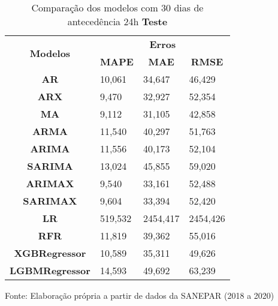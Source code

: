 \begin{table}[H]
	\centering
	\caption{Comparação dos modelos com 30 dias de antecedência 24h \textbf{Teste} }\label{tb:60-24tst}
	\begin{tabular}{@{}clll@{}}
		\toprule
		\multirow{2}{*}{\textbf{Modelos}} & \multicolumn{3}{c}{\textbf{Erros}}                                                                       \\ \cmidrule(l){2-4} 
		& \multicolumn{1}{c}{\textbf{MAPE}} & \multicolumn{1}{c}{\textbf{MAE}} & \multicolumn{1}{c}{\textbf{RMSE}} \\ \hline
\textbf{AR}                       & 10,061                            & 34,647                           & 46,429                            \\
\textbf{ARX}                      & 9,470                             & 32,927                           & 52,354                            \\
\textbf{MA}                       & 9,112                             & 31,105                           & 42,858                            \\
\textbf{ARMA}                     & 11,540                            & 40,297                           & 51,763                            \\
\textbf{ARIMA}                    & 11,556                            & 40,173                           & 52,104                            \\
\textbf{SARIMA}                   & 13,024                            & 45,855                           & 59,020                            \\
\textbf{ARIMAX}                   & 9,540                             & 33,161                           & 52,488                            \\
\textbf{SARIMAX}                  & 9,604                             & 33,394                           & 52,420                            \\
\textbf{LR}        & 519,532                           & 2454,417                         & 2454,426                          \\
\textbf{RFR}  & 11,819                            & 39,362                           & 55,016                            \\
\textbf{XGBRegressor}             & 10,589                            & 35,311                           & 49,626                            \\
\textbf{LGBMRegressor}            & 14,593                            & 49,692                           & 63,239                            \\ \bottomrule
	\end{tabular}

Fonte: Elaboração própria a partir de dados da SANEPAR (2018 a 2020)
\end{table}

